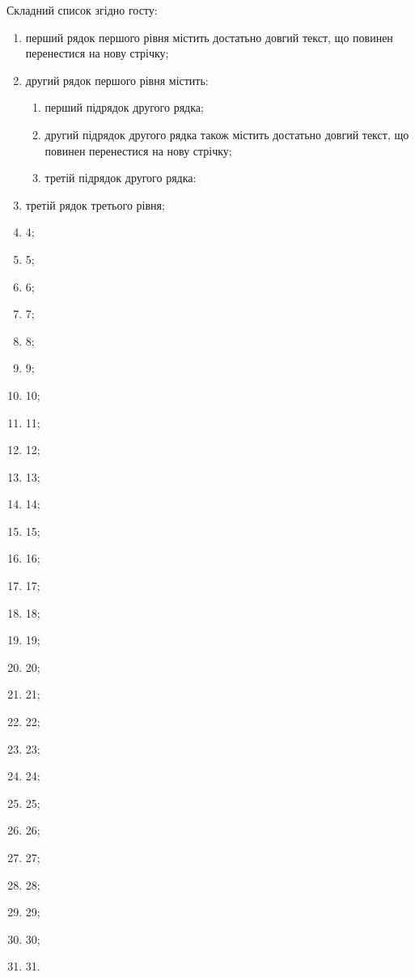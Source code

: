 Складний список згідно госту:
\begin{enumerate}
	\item перший рядок першого рівня містить достатьно довгий текст, що повинен
		  перенестися на нову стрічку;
	\item другий рядок першого рівня містить:
	\begin{enumerate}
		\item перший підрядок другого рядка;
		\item другий підрядок другого рядка також містить достатьно довгий
			  текст, що повинен перенестися на нову стрічку;
		\item третій підрядок другого рядка:
	\end{enumerate}
	\item третій рядок третього рівня;
	\item 4;
	\item 5;
	\item 6;
	\item 7;
	\item 8;
	\item 9;
	\item 10;
	\item 11;
	\item 12;
	\item 13;
	\item 14;
	\item 15;
	\item 16;
	\item 17;
	\item 18;
	\item 19;
	\item 20;
	\item 21;
	\item 22;
	\item 23;
	\item 24;
	\item 25;
	\item 26;
	\item 27;
	\item 28;
	\item 29;
	\item 30;
 	\item 31.
\end{enumerate}

